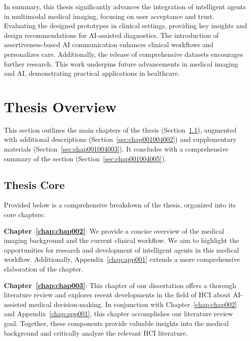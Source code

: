 \vspace{2.00mm}

\textcolor{revised}{In summary, this thesis significantly advances the integration of intelligent agents in multimodal medical imaging, focusing on user acceptance and trust.
Evaluating the designed prototypes in clinical settings, providing key insights and design recommendations for \ac{AI}-assisted diagnostics.
The introduction of assertiveness-based \ac{AI} communication enhances clinical workflows and personalizes care.
Additionally, the release of comprehensive datasets encourages further research.
This work underpins future advancements in medical imaging and \ac{AI}, demonstrating practical applications in healthcare.}

\section{Thesis Overview}
\label{sec:chap001004}

This section outlines the main chapters of the thesis (Section~\ref{sec:chap001004001}), augmented with additional descriptions (Section~\ref{sec:chap001004002}) and supplementary materials (Section~\ref{sec:chap001004003}).
It concludes with a comprehensive summary of the section (Section~\ref{sec:chap001004005}).

\subsection{Thesis Core}
\label{sec:chap001004001}

Provided below is a comprehensive breakdown of the thesis, organized into its core chapters:

\vspace{2.00mm}

\noindent
{\bf Chapter~\ref{chap:chap002}}:
We provide a concise overview of the medical imaging background and the current clinical workflow.
We aim to highlight the opportunities for research and development of intelligent agents in this medical workflow.
Additionally, Appendix~\ref{chap:app001} extends a more comprehensive elaboration of the chapter.

\vspace{2.00mm}

\noindent
{\bf Chapter~\ref{chap:chap003}}:
This chapter of our dissertation offers a thorough literature review and explores recent developments in the field of \ac{HCI} about \ac{AI}-assisted medical decision-making.
In conjunction with Chapter~\ref{chap:chap002} and Appendix~\ref{chap:app001}, this chapter accomplishes our literature review goal.
Together, these components provide valuable insights into the medical background and critically analyze the relevant \ac{HCI} literature.

